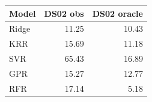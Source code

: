 \begin{tabular}{lrr}
\toprule
Model & DS02 obs & DS02 oracle \\
\midrule
Ridge & 11.25 & 10.43 \\
KRR & 15.69 & 11.18 \\
SVR & 65.43 & 16.89 \\
GPR & 15.27 & 12.77 \\
RFR & 17.14 & 5.18 \\
\bottomrule
\end{tabular}
